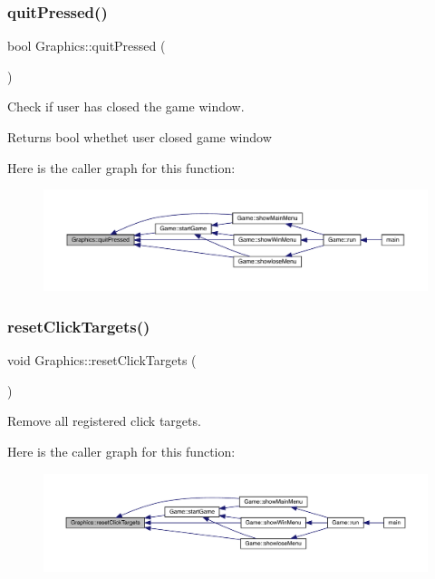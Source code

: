\subsubsection{\texorpdfstring{quit\+Pressed()}{quitPressed()}}
{\footnotesize\ttfamily bool Graphics\+::quit\+Pressed (\begin{DoxyParamCaption}{ }\end{DoxyParamCaption})}



Check if user has closed the game window. 

\begin{DoxyReturn}{Returns}
bool whethet user closed game window 
\end{DoxyReturn}
Here is the caller graph for this function\+:
\nopagebreak
\begin{figure}[H]
\begin{center}
\leavevmode
\includegraphics[width=350pt]{class_graphics_ad6339f656cf977c3a0cdd8688c672125_icgraph}
\end{center}
\end{figure}
\mbox{\label{class_graphics_aedd2af95b26f8b2077e266f692818ea2}} 
\subsubsection{\texorpdfstring{reset\+Click\+Targets()}{resetClickTargets()}}
{\footnotesize\ttfamily void Graphics\+::reset\+Click\+Targets (\begin{DoxyParamCaption}{ }\end{DoxyParamCaption})}



Remove all registered click targets. 

Here is the caller graph for this function\+:
\nopagebreak
\begin{figure}[H]
\begin{center}
\leavevmode
\includegraphics[width=350pt]{class_graphics_aedd2af95b26f8b2077e266f692818ea2_icgraph}
\end{center}
\end{figure}
\mbox{\label{class_graphics_a35b4a23e0938ba205ce2a73ee7df5ea0}} 
